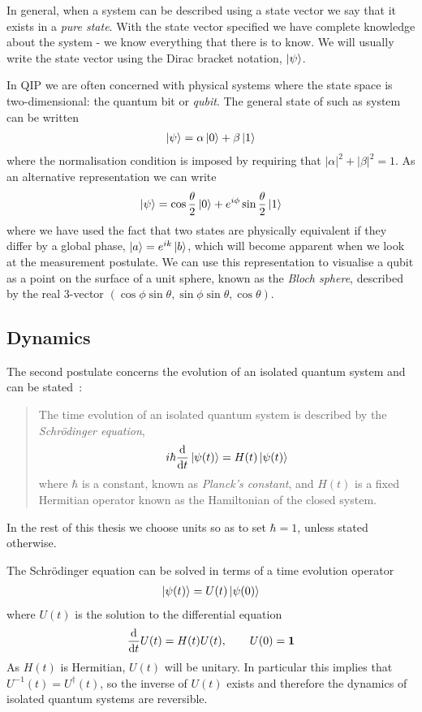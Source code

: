 In general, when a system can be described using a state vector we say that it exists in a \textit{pure state}. With the state vector specified we have complete knowledge about the system - we know everything that there is to know. We will usually write the state vector using the Dirac bracket notation, $\left\vert\psi\right\rangle$. 

In QIP we are often concerned with physical systems where the state space is two-dimensional: the quantum bit or \textit{qubit}. The general state of such as system can be written
\begin{align}
  \left\vert\psi\right\rangle = \alpha\left\vert0\right\rangle + \beta\left\vert1\right\rangle
\end{align}
where the normalisation condition is imposed by requiring that $|\alpha|^2 + |\beta|^2 = 1$. As an alternative representation we can write
\begin{align}
  \left\vert\psi\right\rangle = \cos\frac{\theta}{2}\left\vert0\right\rangle + e^{i\phi}\sin\frac{\theta}{2}\left\vert1\right\rangle
\end{align}
where we have used the fact that two states are physically equivalent if they differ by a global phase, $\left\vert a\right\rangle = e^{ik}\left\vert b\right\rangle$, which will become apparent when we look at the measurement postulate. We can use this representation to visualise a qubit as a point on the surface of a unit sphere, known as the \textit{Bloch sphere}, described by the real $3$-vector $(\cos\phi\sin\theta, \sin\phi\sin\theta, \cos\theta)$.

\subsection{Dynamics}

The second postulate concerns the evolution of an isolated quantum system and can be stated~\cite{nielsen+chuang}:
\begin{quotation}
The time evolution of an isolated quantum system is described by the \textit{Schr\"odinger equation},
\begin{align}
  \label{qd:schrodinger_eq}
  i\hbar\frac{\mathrm{d}}{\mathrm{d}t} \left\vert\psi(t)\right\rangle = H(t) \left\vert\psi(t)\right\rangle
\end{align}
where $\hbar$ is a constant, known as \textit{Planck's constant}, and $H(t)$ is a fixed Hermitian operator known as the Hamiltonian of the closed system.
\end{quotation}
In the rest of this thesis we choose units so as to set $\hbar = 1$, unless stated otherwise. 

The Schr\"odinger equation can be solved in terms of a time evolution operator
\begin{align}
  \left\vert\psi(t)\right\rangle = U(t)\left\vert\psi(0)\right\rangle
\end{align}
where $U(t)$ is the solution to the differential equation
\begin{align}
  \frac{\mathrm{d}}{\mathrm{d}t} U(t) = H(t)U(t), \qquad U(0) = \mathbf{1}
\end{align}
As $H(t)$ is Hermitian, $U(t)$ will be unitary. In particular this implies that $U^{-1}(t) = U^\dagger(t)$, so the inverse of $U(t)$ exists and therefore the dynamics of isolated quantum systems are reversible.

